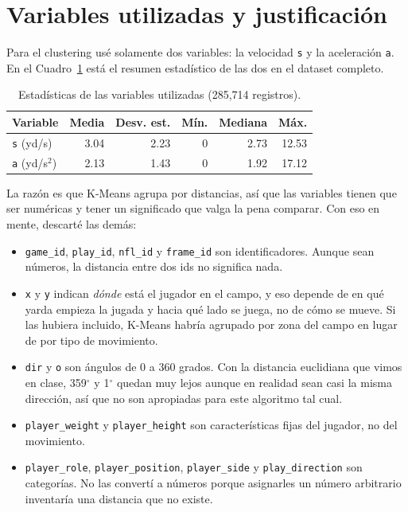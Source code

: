 \documentclass[11pt,a4paper]{article}
\begin{document}
\section{Variables utilizadas y justificación}

Para el clustering usé solamente dos variables: la velocidad \texttt{s} y la aceleración \texttt{a}. En el Cuadro~\ref{tab:vars} está el resumen estadístico de las dos en el dataset completo.

\begin{table}[H]
  \centering
  \begin{tabular}{lrrrrr}
    \toprule
    Variable & Media & Desv. est. & Mín. & Mediana & Máx. \\
    \midrule
    \texttt{s} (yd/s)     & 3.04 & 2.23 & 0 & 2.73 & 12.53 \\
    \texttt{a} (yd/s$^2$) & 2.13 & 1.43 & 0 & 1.92 & 17.12 \\
    \bottomrule
  \end{tabular}
  \caption{Estadísticas de las variables utilizadas (285{,}714 registros).}
  \label{tab:vars}
\end{table}

La razón es que K-Means agrupa por distancias, así que las variables tienen que ser numéricas y tener un significado que valga la pena comparar. Con eso en mente, descarté las demás:

\begin{itemize}
  \item \texttt{game\_id}, \texttt{play\_id}, \texttt{nfl\_id} y \texttt{frame\_id} son identificadores. Aunque sean números, la distancia entre dos ids no significa nada.
  \item \texttt{x} y \texttt{y} indican \emph{dónde} está el jugador en el campo, y eso depende de en qué yarda empieza la jugada y hacia qué lado se juega, no de cómo se mueve. Si las hubiera incluido, K-Means habría agrupado por zona del campo en lugar de por tipo de movimiento.
  \item \texttt{dir} y \texttt{o} son ángulos de 0 a 360 grados. Con la distancia euclidiana que vimos en clase, 359$^\circ$ y 1$^\circ$ quedan muy lejos aunque en realidad sean casi la misma dirección, así que no son apropiadas para este algoritmo tal cual.
  \item \texttt{player\_weight} y \texttt{player\_height} son características fijas del jugador, no del movimiento.
  \item \texttt{player\_role}, \texttt{player\_position}, \texttt{player\_side} y \texttt{play\_direction} son categorías. No las convertí a números porque asignarles un número arbitrario inventaría una distancia que no existe.
\end{itemize}
\end{document}
